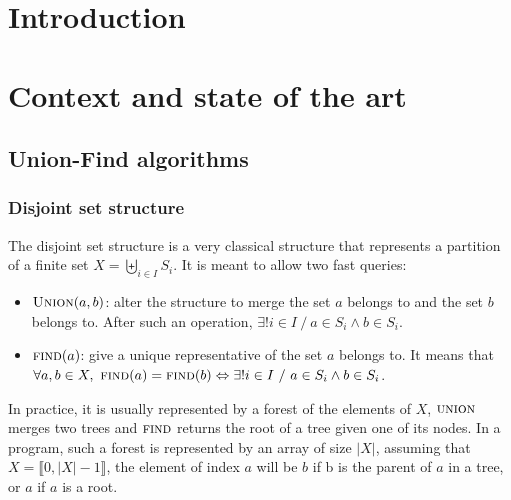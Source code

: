 \documentclass[12px]{article}
\begin{document}
  \section{Introduction}

  \section{Context and state of the art}
    \subsection{Union-Find algorithms}
      \subsubsection{Disjoint set structure}
        The disjoint set structure is a very classical structure that represents a partition of a finite set $X = \biguplus\limits_{i \in I} S_i$. It is meant to allow two fast queries:
        \begin{itemize}
          \item $\Call{Union}{a, b}$: alter the structure to merge the set $a$ belongs to and the set $b$ belongs to. After such an operation, $\exists! i \in I~/~a \in S_i \land b \in S_i$.
          \item $\Call{find}{a}$: give a unique representative of the set $a$ belongs to. It means that $\forall a, b \in X,~\Call{find}{a} = \Call{find}{b} \Leftrightarrow \exists! i \in I~/~a \in S_i \land b \in S_i$.
        \end{itemize}
        In practice, it is usually represented by a forest of the elements of $X$, $\textsc{union}$ merges two trees and $\textsc{find}$ returns the root of a tree given one of its nodes.
        In a program, such a forest is represented by an array of size $|X|$, assuming that $X = \llbracket 0, |X|-1 \rrbracket$, the element of index $a$ will be $b$ if b is the parent of $a$ in a tree, or $a$ if $a$ is a root.
\end{document}

